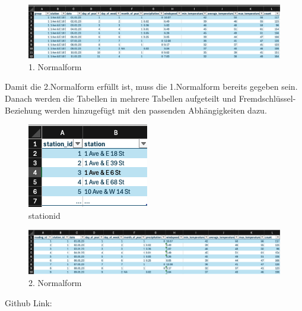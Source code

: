 \documentclass{article}
\begin{document}
\begin{figure}[htbp]
    \hspace{-2.5cm}
    \includegraphics[width=1.5\linewidth]{Normalform 1.png}
    \caption{1. Normalform}
    \label{fig:enter-label}
\end{figure}
\newpage

Damit die 2.Normalform erfüllt ist, muss die 1.Normalform bereits gegeben sein. Danach werden die Tabellen in mehrere  Tabellen aufgeteilt und Fremdschlüssel-Beziehung werden hinzugefügt mit den passenden Abhängigkeiten dazu. 

\begin{figure}[htbp]
    \centering
    \includegraphics[width=0.5\linewidth]{Station id1.png}
    \caption{stationid}
\end{figure}

\begin{figure}[htbp]
    \hspace{-2.5cm}
    \includegraphics[width=1.5\linewidth]{Normalform2.png}
    \caption{2. Normalform}
\end{figure}


\newpage







Github Link: \url{}


      
\end{document}
